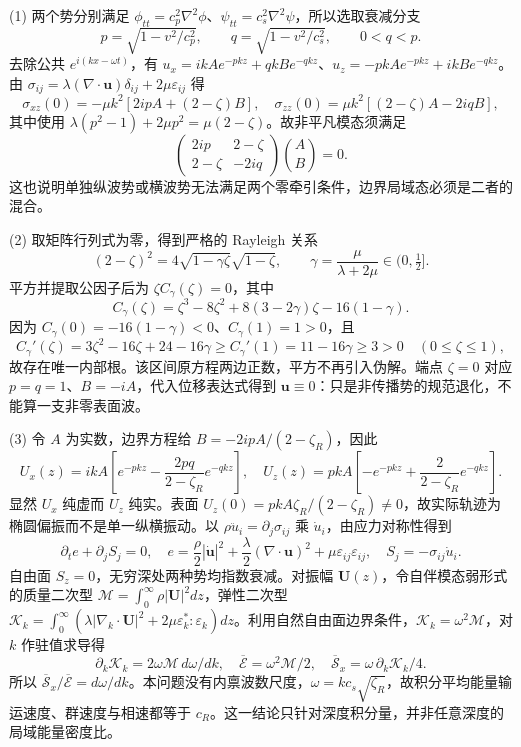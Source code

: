 (1) 两个势分别满足 \(\phi_{tt}=c_p^2\nabla^2\phi\)、\(\psi_{tt}=c_s^2\nabla^2\psi\)，所以选取衰减分支
\[
p=\sqrt{1-v^2/c_p^2},\qquad q=\sqrt{1-v^2/c_s^2},\qquad 0<q<p.
\]
去除公共 \(e^{i(kx-\omega t)}\)，有 \(u_x=ikAe^{-pkz}+qkBe^{-qkz}\)、\(u_z=-pkAe^{-pkz}+ikBe^{-qkz}\)。由 \(\sigma_{ij}=\lambda(\nabla\cdot\boldsymbol u)\delta_{ij}+2\mu\varepsilon_{ij}\) 得
\[
\sigma_{xz}(0)=-\mu k^2[2ipA+(2-\zeta)B],\quad
\sigma_{zz}(0)=\mu k^2[(2-\zeta)A-2iqB],
\]
其中使用 \(\lambda(p^2-1)+2\mu p^2=\mu(2-\zeta)\)。故非平凡模态须满足
\[
\begin{pmatrix}2ip&2-\zeta\\2-\zeta&-2iq\end{pmatrix}\binom AB=0.
\]
这也说明单独纵波势或横波势无法满足两个零牵引条件，边界局域态必须是二者的混合。

(2) 取矩阵行列式为零，得到严格的 Rayleigh 关系
\[
\boxed{(2-\zeta)^2=4\sqrt{1-\gamma\zeta}\sqrt{1-\zeta}},
\qquad \gamma=\frac{\mu}{\lambda+2\mu}\in(0,\tfrac12].
\]
平方并提取公因子后为 \(\zeta C_\gamma(\zeta)=0\)，其中
\[
C_\gamma(\zeta)=\zeta^3-8\zeta^2+8(3-2\gamma)\zeta-16(1-\gamma).
\]
因为 \(C_\gamma(0)=-16(1-\gamma)<0\)、\(C_\gamma(1)=1>0\)，且
\[
C_\gamma'(\zeta)=3\zeta^2-16\zeta+24-16\gamma
\ge C_\gamma'(1)=11-16\gamma\ge3>0\quad(0\le\zeta\le1),
\]
故存在唯一内部根。该区间原方程两边正数，平方不再引入伪解。端点 \(\zeta=0\) 对应 \(p=q=1\)、\(B=-iA\)，代入位移表达式得到 \(\boldsymbol u\equiv0\)：只是非传播势的规范退化，不能算一支非零表面波。

(3) 令 \(A\) 为实数，边界方程给 \(B=-2ipA/(2-\zeta_R)\)，因此
\[
U_x(z)=ikA\left[e^{-pkz}-\frac{2pq}{2-\zeta_R}e^{-qkz}\right],\quad
U_z(z)=pkA\left[-e^{-pkz}+\frac{2}{2-\zeta_R}e^{-qkz}\right].
\]
显然 \(U_x\) 纯虚而 \(U_z\) 纯实。表面 \(U_z(0)=pkA\zeta_R/(2-\zeta_R)\ne0\)，故实际轨迹为椭圆偏振而不是单一纵横振动。以 \(\rho\ddot u_i=\partial_j\sigma_{ij}\) 乘 \(\dot u_i\)，由应力对称性得到
\[
\partial_t e+\partial_jS_j=0,\quad
e=\frac{\rho}{2}|\dot{\boldsymbol u}|^2+\frac{\lambda}{2}(\nabla\cdot\boldsymbol u)^2+\mu\varepsilon_{ij}\varepsilon_{ij},\quad
S_j=-\sigma_{ij}\dot u_i.
\]
自由面 \(S_z=0\)，无穷深处两种势均指数衰减。对振幅 \(\boldsymbol U(z)\)，令自伴模态弱形式的质量二次型 \(\mathcal M=\int_0^\infty\rho|\boldsymbol U|^2dz\)，弹性二次型 \(\mathcal K_k=\int_0^\infty(\lambda|\nabla_k\cdot\boldsymbol U|^2+2\mu\varepsilon_k^*:\varepsilon_k)dz\)。利用自然自由面边界条件，\(\mathcal K_k=\omega^2\mathcal M\)，对 \(k\) 作驻值求导得
\[
\partial_k\mathcal K_k=2\omega\mathcal M\,d\omega/dk,\quad
\overline{\mathscr E}=\omega^2\mathcal M/2,\quad
\overline{\mathscr S}_x=\omega\,\partial_k\mathcal K_k/4.
\]
所以 \(\overline{\mathscr S}_x/\overline{\mathscr E}=d\omega/dk\)。本问题没有内禀波数尺度，\(\omega=kc_s\sqrt{\zeta_R}\)，故积分平均能量输运速度、群速度与相速都等于 \(c_R\)。这一结论只针对深度积分量，并非任意深度的局域能量密度比。

